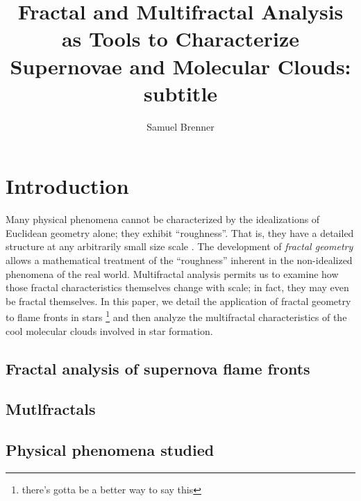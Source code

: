 \documentclass[iop]{emulateapj}
\begin{document}
%
\title{Fractal and Multifractal Analysis as Tools to Characterize Supernovae and Molecular Clouds: \\
subtitle}
%
\author{Samuel Brenner}
%
%
%
%
%
%
\begin{abstract}
\end{abstract}
%
%
%
%
%
%

\section{Introduction}
Many physical phenomena cannot be characterized by the idealizations of Euclidean geometry alone; they exhibit ``roughness''. That is, they have a detailed structure at any arbitrarily small size scale \citep{fractaltextbook}. The development of \textit{fractal geometry} allows a mathematical treatment of the ``roughness'' inherent in the non-idealized phenomena of the real world. Multifractal analysis permits us to examine how those fractal characteristics themselves change with scale; in fact, they may even be fractal themselves. In this paper, we detail the application of fractal geometry to flame fronts in stars \footnote{there's gotta be a better way to say this} and then analyze the multifractal characteristics of the cool molecular clouds involved in star formation.

\subsection{Fractal analysis of supernova flame fronts}



\subsection{Mutlfractals}

\subsection{Physical phenomena studied}
\end{document}
